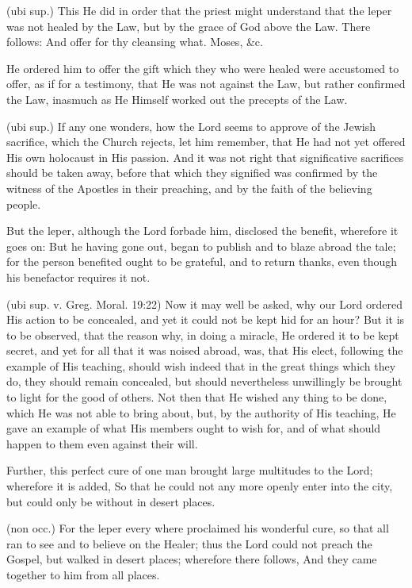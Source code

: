  (ubi sup.) This He did in order that the priest might understand that the leper was not healed by the Law, but by the grace of God above the Law. There follows: And offer for thy cleansing what. Moses, \&c.

 He ordered him to offer the gift which they who were healed were accustomed to offer, as if for a testimony, that He was not against the Law, but rather confirmed the Law, inasmuch as He Himself worked out the precepts of the Law.

 (ubi sup.) If any one wonders, how the Lord seems to approve of the Jewish sacrifice, which the Church rejects, let him remember, that He had not yet offered His own holocaust in His passion. And it was not right that significative sacrifices should be taken away, before that which they signified was confirmed by the witness of the Apostles in their preaching, and by the faith of the believing people.

 But the leper, although the Lord forbade him, disclosed the benefit, wherefore it goes on: But he having gone out, began to publish and to blaze abroad the tale; for the person benefited ought to be grateful, and to return thanks, even though his benefactor requires it not.

 (ubi sup. v. Greg. Moral. 19:22) Now it may well be asked, why our Lord ordered His action to be concealed, and yet it could not be kept hid for an hour? But it is to be observed, that the reason why, in doing a miracle, He ordered it to be kept secret, and yet for all that it was noised abroad, was, that His elect, following the example of His teaching, should wish indeed that in the great things which they do, they should remain concealed, but should nevertheless unwillingly be brought to light for the good of others. Not then that He wished any thing to be done, which He was not able to bring about, but, by the authority of His teaching, He gave an example of what His members ought to wish for, and of what should happen to them even against their will.

 Further, this perfect cure of one man brought large multitudes to the Lord; wherefore it is added, So that he could not any more openly enter into the city, but could only be without in desert places.

 (non occ.) For the leper every where proclaimed his wonderful cure, so that all ran to see and to believe on the Healer; thus the Lord could not preach the Gospel, but walked in desert places; wherefore there follows, And they came together to him from all places.

